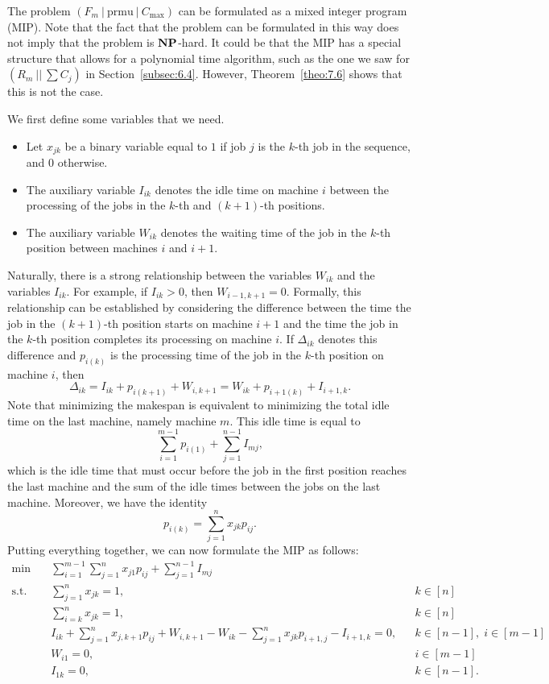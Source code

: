The problem $(F_m~|~\text{prmu}~|~C_{\max})$ can be formulated 
as a mixed integer program (MIP). Note that the fact that the problem 
can be formulated in this way does not imply that the problem is 
$\operatorname{\textbf{NP}}$-hard. It could be that the MIP has a special structure that 
allows for a polynomial time algorithm, such as the one we saw 
for $(R_m~||~\sum C_j)$ in Section~\ref{subsec:6.4}. However, 
Theorem~\ref{theo:7.6} shows that this is not the case. 

We first define some variables that we need.
\begin{itemize}
    \item Let $x_{jk}$ be a binary variable equal to $1$ if job $j$ is the 
    $k$-th job in the sequence, and $0$ otherwise. 
    \item The auxiliary variable $I_{ik}$ denotes the idle time on machine $i$
    between the processing of the jobs in the $k$-th and $(k+1)$-th positions. 
    \item The auxiliary variable $W_{ik}$ denotes the waiting time of the 
    job in the $k$-th position between machines $i$ and $i+1$. 
\end{itemize} 
Naturally, there is a strong relationship between the variables $W_{ik}$ and 
the variables $I_{ik}$. For example, if $I_{ik} > 0$, then 
$W_{i-1,k+1} = 0$. Formally, this relationship can be established by 
considering the difference between the time the job in the $(k+1)$-th 
position starts on machine $i+1$ and the time the job in the $k$-th position 
completes its processing on machine $i$. If $\Delta_{ik}$ denotes this 
difference and $p_{i(k)}$ is the processing time of the job in the 
$k$-th position on machine $i$, then 
\[ \Delta_{ik} = I_{ik} + p_{i(k+1)} + W_{i,k+1} = W_{ik} + p_{i+1(k)} 
+ I_{i+1,k}. \] 
Note that minimizing the makespan is equivalent to minimizing the 
total idle time on the last machine, namely machine $m$. This idle 
time is equal to 
\[ \sum_{i=1}^{m-1} p_{i(1)} + \sum_{j=1}^{n-1} I_{mj}, \] 
which is the idle time that must occur before the job in the first position 
reaches the last machine and the sum of the idle times between the jobs 
on the last machine. Moreover, we have the identity
\[ p_{i(k)} = \sum_{j=1}^n x_{jk} p_{ij}. \] 
Putting everything together, we can now formulate the MIP as follows: 
\begin{align*}
    \min\quad & \sum_{i=1}^{m-1} \sum_{j=1}^n x_{j1} p_{ij} + \sum_{j=1}^{n-1} I_{mj} \\ 
    \text{s.t.}\quad & \sum_{j=1}^n x_{jk} = 1, && k \in [n] \\ 
    & \sum_{i=k}^n x_{jk} = 1, && k \in [n] \\ 
    & I_{ik} + \sum_{j=1}^n x_{j,k+1} p_{ij} + W_{i,k+1} - W_{ik} 
    - \sum_{j=1}^n x_{jk} p_{i+1,j} - I_{i+1,k} = 0, && k \in [n-1],\; i \in [m-1] \\
    & W_{i1} = 0, && i \in [m-1] \\
    & I_{1k} = 0, && k \in [n-1].
\end{align*}
